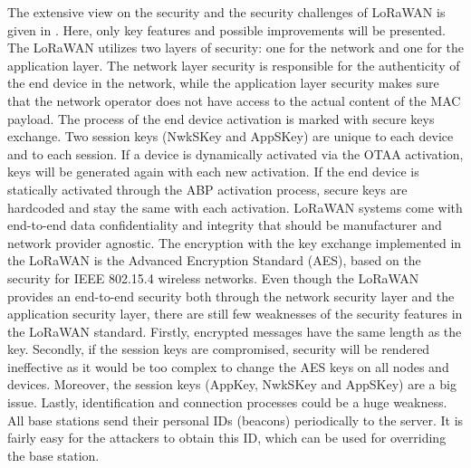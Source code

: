 The extensive view on the security and the security challenges of LoRaWAN is given in \cite{security_lora}. Here, only key features and possible improvements will be presented.
The LoRaWAN utilizes two layers of security: one for the network and one for the application layer. 
The network layer security is responsible for the authenticity of the end device in the network, while the application layer security makes sure that the network operator does not have access to the actual content of the MAC payload.
The process of the end device activation is marked with secure keys exchange. 
Two session keys (NwkSKey and AppSKey) are unique to each device and to each session. 
If a device is dynamically activated via the OTAA activation, keys will be generated again with each new activation. 
If the end device is statically activated through the ABP activation process, secure keys are hardcoded and stay the same with each activation.
LoRaWAN systems come with end-to-end data confidentiality and integrity that should be manufacturer and network provider agnostic. 
The encryption with the key exchange implemented in the LoRaWAN is the Advanced Encryption Standard (AES), based on the security for IEEE 802.15.4 wireless networks.
Even though the LoRaWAN provides an end-to-end security both through the network security layer and the application security layer, there are still few weaknesses of the security features in the LoRaWAN standard.
Firstly, encrypted messages have the same length as the key. Secondly, if the session keys are compromised, security will be rendered ineffective as it would be too complex to change the AES keys on all nodes and devices. 
Moreover, the session keys (AppKey, NwkSKey and AppSKey) are a big issue. 
Lastly, identification and connection processes could be a huge weakness. 
All base stations send their personal IDs (beacons) periodically to the server. 
It is fairly easy for the attackers to obtain this ID, which can be used for overriding the base station.
